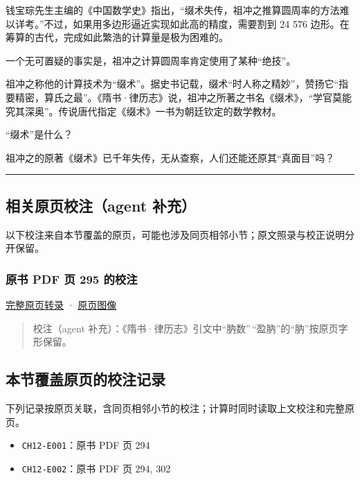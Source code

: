 \documentclass[
  10pt,
  fontset=fandol]{ctexart}
\providecommand{\tightlist}{%
  \setlength{\itemsep}{0pt}\setlength{\parskip}{0pt}}
\begin{document}
钱宝琮先生主编的《中国数学史》指出，``缀术失传，祖冲之推算圆周率的方法难以详考。''不过，如果用多边形逼近实现如此高的精度，需要割到 24 576 边形。在筹算的古代，完成如此繁浩的计算量是极为困难的。

一个无可置疑的事实是，祖冲之计算圆周率肯定使用了某种``绝技''。

祖冲之称他的计算技术为``缀术''。据史书记载，缀术``时人称之精妙''，赞扬它``指要精密，算氏之最''。《隋书·律历志》说，祖冲之所著之书名《缀术》，``学官莫能究其深奥''。传说唐代指定《缀术》一书为朝廷钦定的数学教材。

``缀术''是什么？

祖冲之的原著《缀术》已千年失传，无从查察，人们还能还原其``真面目''吗？

\begin{center}\rule{0.5\linewidth}{0.5pt}\end{center}

\subsection{相关原页校注（agent 补充）}\label{ux76f8ux5173ux539fux9875ux6821ux6ce8agent-ux8865ux5145}

以下校注来自本节覆盖的原页，可能也涉及同页相邻小节；原文照录与校正说明分开保留。

\subsubsection{原书 PDF 页 295 的校注}\label{ux539fux4e66-pdf-ux9875-295-ux7684ux6821ux6ce8}

\href{../pages/pdf-295.md}{完整原页转录} · \href{../../source-images/pdf-295.jpeg}{原页图像}

\begin{quote}
校注（agent 补充）：《隋书·律历志》引文中``肭数''\,``盈肭''的``肭''按原页字形保留。
\end{quote}

\subsection{本节覆盖原页的校注记录}\label{ux672cux8282ux8986ux76d6ux539fux9875ux7684ux6821ux6ce8ux8bb0ux5f55}

下列记录按原页关联，含同页相邻小节的校注；计算时同时读取上文校注和完整原页。

\begin{itemize}
\tightlist
\item
  \texttt{CH12-E001}：原书 PDF 页 294
\item
  \texttt{CH12-E002}：原书 PDF 页 294, 302
\end{itemize}
\end{document}
